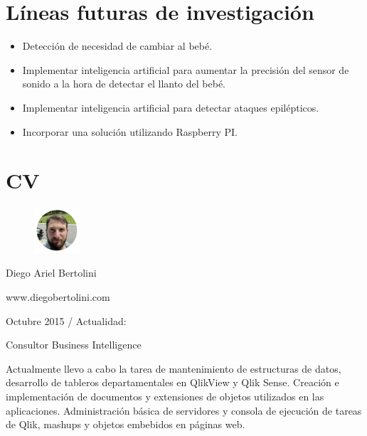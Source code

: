 \documentclass{IEEEtran}
\begin{document}
	\section{Líneas futuras de investigación}

		\begin{itemize}
			\item Detección de necesidad de cambiar al bebé.
			\item Implementar inteligencia artificial para aumentar la precisión del sensor de sonido a la hora de detectar el llanto del bebé.
			\item Implementar inteligencia artificial para detectar ataques epilépticos.
			\item Incorporar una solución utilizando Raspberry PI.
		\end{itemize}
		
		
	
	\newpage
	
	\section{CV}
	

\begin{figure}
    \centering
    \includegraphics[width=0.15\textwidth]{diego.png}
\end{figure}
        
        Diego Ariel Bertolini
        
        www.diegobertolini.com
        
        Octubre 2015 / Actualidad:
        
        Consultor Business Intelligence
        
        Actualmente llevo a cabo la tarea de mantenimiento de estructuras de datos, desarrollo de tableros departamentales en QlikView y Qlik Sense. Creación e implementación de documentos y extensiones de objetos utilizados en las aplicaciones. Administración básica de servidores y consola de ejecución de tareas de Qlik, mashups y objetos embebidos en páginas web.
        
\end{document}
